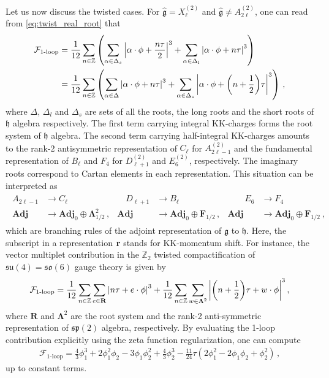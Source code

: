 Let us now discuss the twisted cases. For $ \hat{\mathfrak{g}} = X_\ell^{(2)} $ and $ \hat{\mathfrak{g}} \neq A_{2\ell}^{(2)} $, one can read from \eqref{eq:twist_real_root} that
\begin{align}
\mathcal{F}_{\text{1-loop}}
&= \frac{1}{12} \sum_{n \in \mathbb{Z}} \qty( \sum_{\alpha \in \Delta_s} \abs{\alpha\cdot \phi + \frac{n \tau}{2}}^3 + \sum_{\alpha \in \Delta_l} \abs{\alpha\cdot \phi + n \tau}^3 ) \nonumber \\
&= \frac{1}{12} \sum_{n \in \mathbb{Z}} \qty( \sum_{\alpha \in \Delta} \abs{\alpha\cdot \phi + n \tau}^3 + \sum_{\alpha \in \Delta_s} \abs{\alpha \cdot \phi+ \qty(n + \frac{1}{2})\tau}^3 )\ ,
\end{align}
where $ \Delta $, $ \Delta_l $ and $ \Delta_s $ are sets of all the roots, the long roots and the short roots of $ \mathfrak{h} $ algebra respectively. The first term carrying integral KK-charges forms the root system of $\mathfrak{h}$ algebra. The second term carrying half-integral KK-charges amounts to the rank-2 antisymmetric representation of $C_\ell$ for $A^{(2)}_{2\ell-1}$ and the fundamental representation of $B_\ell$ and $F_4$ for $D^{(2)}_{\ell+1}$ and $E^{(2)}_6$, respectively. The imaginary roots correspond to Cartan elements in each representation. This situation can be interpreted as
\begin{align}
\begin{array}{rlrlrl}
A_{2\ell-1} &\to C_{\ell} & \quad D_{\ell+1} & \to B_\ell & \qquad E_6 &\to F_4  \\
\mathbf{Adj} &\to \mathbf{Adj}_0 \oplus \mathbf{\Lambda}^2_{1/2} \, , & \mathbf{Adj} &\to \mathbf{Adj}_0 \oplus \mathbf{F}_{1/2} \, , & \mathbf{Adj} &\to \mathbf{Adj}_0 \oplus \mathbf{F}_{1/2}\ ,
\end{array}
\end{align}
which are branching rules of the adjoint representation of $ \mathfrak{g} $ to $ \mathfrak{h} $. Here, the subscript in a representation ${\bf r}$ stands for KK-momentum shift. For instance, the vector multiplet contribution in the $ \mathbb{Z}_2 $ twisted compactification of $ \mathfrak{su}(4) = \mathfrak{so}(6) $ gauge theory is given by
\begin{align}
\mathcal{F}_{\text{1-loop}}
= \frac{1}{12} \sum_{n \in \mathbb{Z}} \sum_{e \in \mathbf{R}} \abs{n \tau + e\cdot \phi}^3 + \frac{1}{12} \sum_{n \in \mathbb{Z}} \sum_{w \in \mathbf{\Lambda}^2} \abs{\qty(n+\frac{1}{2})\tau + w\cdot \phi}^3 \, ,
\end{align}
where $ \mathbf{R} $ and $ \mathbf{\Lambda}^2 $ are the root system and the rank-2 anti-symmetric representation of $ \mathfrak{sp}(2) $ algebra, respectively. By evaluating the 1-loop contribution explicitly using the zeta function regularization, one can compute
\begin{align}
\mathcal{F}_{\text{1-loop}}
= \frac{4}{3}\phi_1^3 + 2\phi_1^2 \phi_2 - 3\phi_1 \phi_2^2 + \frac{4}{3}\phi_2^3 - \frac{11}{24}\tau (2\phi_1^2 - 2\phi_1 \phi_2 + \phi_2^2)\, ,
\end{align}
up to constant terms. 

